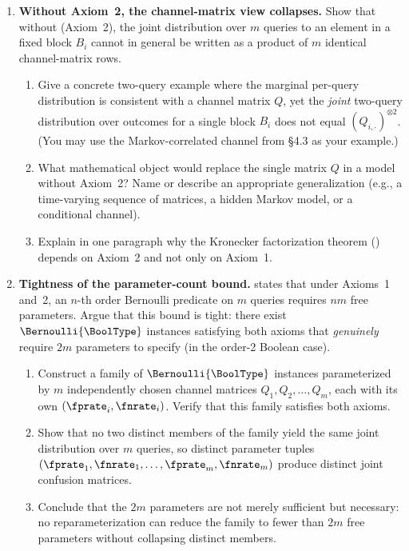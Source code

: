 \begin{enumerate}
\item \exstarstarstar
\textbf{Without Axiom~2, the channel-matrix view collapses.}
Show that without  (Axiom~2), the joint
distribution over $m$ queries to an element in a fixed block $B_i$ cannot
in general be written as a product of $m$ identical channel-matrix rows.
\begin{enumerate}
  \item[(a)] Give a concrete two-query example where the marginal per-query
    distribution is consistent with a channel matrix $Q$, yet the
    \emph{joint} two-query distribution over outcomes for a single block
    $B_i$ does not equal $(Q_{i,\cdot})^{\otimes 2}$.
    (You may use the Markov-correlated channel from §4.3 as your example.)
  \item[(b)] What mathematical object would replace the single matrix $Q$
    in a model without Axiom~2? Name or describe an appropriate
    generalization (e.g., a time-varying sequence of matrices, a hidden
    Markov model, or a conditional channel).
  \item[(c)] Explain in one paragraph why the Kronecker factorization theorem
    () depends on Axiom~2 and not only on Axiom~1.
\end{enumerate}

\item \exstarstarstar
\textbf{Tightness of the parameter-count bound.}
 states that under Axioms~1 and~2, an
$n$-th order Bernoulli predicate on $m$ queries requires $nm$ free
parameters. Argue that this bound is tight: there exist $\Bernoulli{\BoolType}$
instances satisfying both axioms that \emph{genuinely} require $2m$ parameters
to specify (in the order-2 Boolean case).
\begin{enumerate}
  \item[(a)] Construct a family of $\Bernoulli{\BoolType}$ instances
    parameterized by $m$ independently chosen channel matrices
    $Q_1, Q_2, \ldots, Q_m$, each with its own $(\fprate_i, \fnrate_i)$.
    Verify that this family satisfies both axioms.
  \item[(b)] Show that no two distinct members of the family yield the same
    joint distribution over $m$ queries, so distinct parameter tuples
    $(\fprate_1, \fnrate_1, \ldots, \fprate_m, \fnrate_m)$ produce distinct
    joint confusion matrices.
  \item[(c)] Conclude that the $2m$ parameters are not merely sufficient but
    necessary: no reparameterization can reduce the family to fewer than $2m$
    free parameters without collapsing distinct members.
\end{enumerate}

\end{enumerate}
